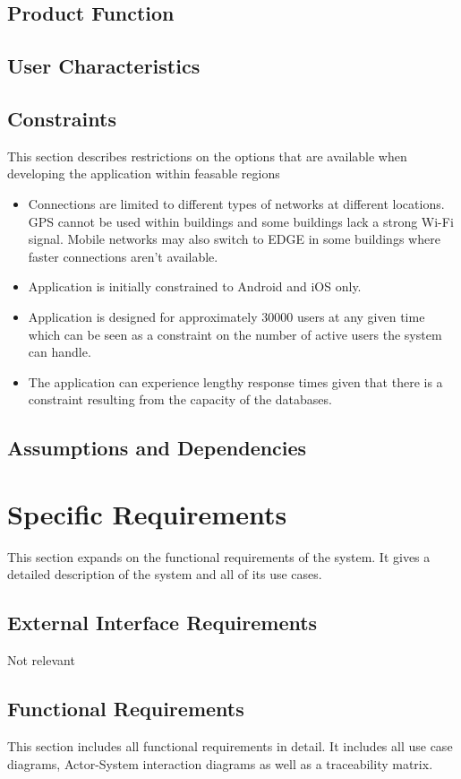 \documentclass{article}
\begin{document}
	\subsection{Product Function}
	\subsection{User Characteristics}
	\subsection{Constraints}
	This section describes restrictions on the options that are available when developing the application within feasable regions
		\begin{itemize}
			\item Connections are limited to different types of networks at different locations. GPS cannot be used within buildings and some buildings lack a strong Wi-Fi signal. Mobile networks may also switch to EDGE in some buildings where faster connections aren't available.
			\item Application is initially constrained to Android and iOS only.
			\item Application is designed for approximately 30000 users at any given time which can be seen as a constraint on the number of active users the system can handle.
			\item The application can experience lengthy response times given that there is a constraint resulting from the capacity of the databases.\newline
		\end{itemize}
	
	\subsection{Assumptions and Dependencies}
	
	\section{Specific Requirements}
	This section expands on the functional requirements of the system. It gives a detailed 	description of the system and all of its use cases.
	
	\subsection{External Interface Requirements}
	Not relevant
	\subsection{Functional Requirements}
	This section includes all functional requirements in detail. It includes all use case diagrams, Actor-System interaction diagrams as well as a traceability matrix.	
	
\end{document}
